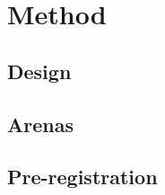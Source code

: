 \section{Method}
\label{sec:method}


\subsection{Design}
%

\subsection{Arenas}

\subsection{Pre-registration}
%
%

